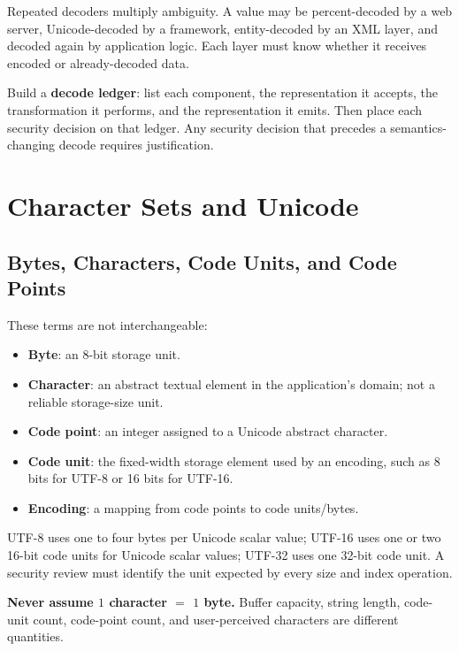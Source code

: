\documentclass[11pt]{article}
\newcommand{\term}[1]{\textbf{#1}}
\begin{document}
Repeated decoders multiply ambiguity. A value may be percent-decoded by a web server, Unicode-decoded by a framework, entity-decoded by an XML layer, and decoded again by application logic. Each layer must know whether it receives encoded or already-decoded data.

\begin{auditheuristic}
Build a \textbf{decode ledger}: list each component, the representation it accepts, the transformation it performs, and the representation it emits. Then place each security decision on that ledger. Any security decision that precedes a semantics-changing decode requires justification.
\end{auditheuristic}
\clearpage

\section{Character Sets and Unicode}

\subsection{Bytes, Characters, Code Units, and Code Points}

These terms are not interchangeable:

\begin{itemize}
  \item \term{Byte}: an 8-bit storage unit.
  \item \term{Character}: an abstract textual element in the application's domain; not a reliable storage-size unit.
  \item \term{Code point}: an integer assigned to a Unicode abstract character.
  \item \term{Code unit}: the fixed-width storage element used by an encoding, such as 8 bits for UTF-8 or 16 bits for UTF-16.
  \item \term{Encoding}: a mapping from code points to code units/bytes.
\end{itemize}

UTF-8 uses one to four bytes per Unicode scalar value; UTF-16 uses one or two 16-bit code units for Unicode scalar values; UTF-32 uses one 32-bit code unit. A security review must identify the unit expected by every size and index operation.

\begin{dangerousassumption}
\textbf{Never assume \(1\) character \(=\) \(1\) byte.} Buffer capacity, string length, code-unit count, code-point count, and user-perceived characters are different quantities.
\end{dangerousassumption}
\end{document}
